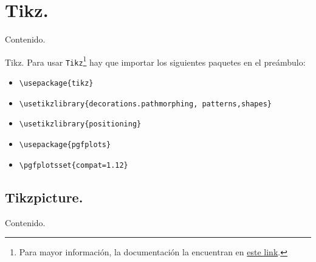 \documentclass[dvipsnames,xcolor=x11names]{beamer}
\theoremstyle{plain}
\theoremstyle{definition}
\begin{document}
\section{Tikz.}
\begin{frame}{Contenido.}
  \tableofcontents[currentsection]
\end{frame}
\begin{frame}[fragile]{Tikz.}
    Para usar \verb!Tikz!\footnote{Para mayor información, la documentación la encuentran en \href{https://www.bu.edu/math/files/2013/08/tikzpgfmanual.pdf}{\textcolor{colorClase}{este link}}.} hay que importar los siguientes paquetes en el preámbulo:
    
    \begin{footnotesize}
    \begin{itemize}
        \item \verb!\usepackage{tikz}!
        \item \verb!\usetikzlibrary{decorations.pathmorphing, patterns,shapes}!
        \item \verb!\usetikzlibrary{positioning}!
        \item \verb!\usepackage{pgfplots}!
        \item \verb!\pgfplotsset{compat=1.12}!
    \end{itemize}
    \end{footnotesize}
    
    
\end{frame}

\subsection{Tikzpicture.}
\begin{frame}{Contenido.}
  \tableofcontents[currentsubsection]
\end{frame}
\end{document}

